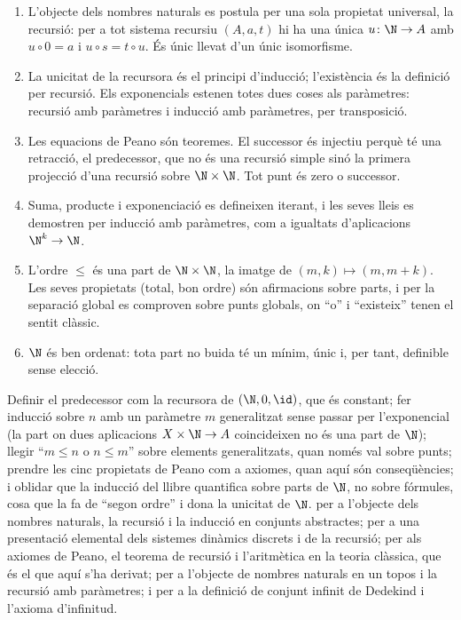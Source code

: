 \begin{resumcap}
\begin{enumerate}
  \item L'objecte dels nombres naturals es postula per una sola propietat universal, la recursió: per a tot sistema recursiu \((A,a,t)\) hi ha una única \(u\colon\N\to A\) amb \(u\circ0=a\) i \(u\circ s=t\circ u\). És únic llevat d'un únic isomorfisme.
  \item La unicitat de la recursora és el principi d'inducció; l'existència és la definició per recursió. Els exponencials estenen totes dues coses als paràmetres: recursió amb paràmetres i inducció amb paràmetres, per transposició.
  \item Les equacions de Peano són teoremes. El successor és injectiu perquè té una retracció, el predecessor, que no és una recursió simple sinó la primera projecció d'una recursió sobre \(\N\times\N\). Tot punt és zero o successor.
  \item Suma, producte i exponenciació es defineixen iterant, i les seves lleis es demostren per inducció amb paràmetres, com a igualtats d'aplicacions \(\N^k\to\N\).
  \item L'ordre \(\le\) és una part de \(\N\times\N\), la imatge de \((m,k)\mapsto(m,m+k)\). Les seves propietats (total, bon ordre) són afirmacions sobre parts, i per la separació global es comproven sobre punts globals, on \enquote{o} i \enquote{existeix} tenen el sentit clàssic.
  \item \(\N\) és ben ordenat: tota part no buida té un mínim, únic i, per tant, definible sense elecció.
\end{enumerate}
 Definir el predecessor com la recursora de \((\N,0,\id)\), que és constant; fer inducció sobre \(n\) amb un paràmetre \(m\) generalitzat sense passar per l'exponencial (la part on dues aplicacions \(X\times\N\to A\) coincideixen no és una part de \(\N\)); llegir \enquote{\(m\le n\) o \(n\le m\)} sobre elements generalitzats, quan només val sobre punts; prendre les cinc propietats de Peano com a axiomes, quan aquí són conseqüències; i oblidar que la inducció del llibre quantifica sobre parts de \(\N\), no sobre fórmules, cosa que la fa de \enquote{segon ordre} i dona la unicitat de \(\N\).
 \cite[§§7.3--7.5]{lawvere-rosebrugh} per a l'objecte dels nombres naturals, la recursió i la inducció en conjunts abstractes; \cite[sessió~26 i article~V]{lawvere-schanuel} per a una presentació elemental dels sistemes dinàmics discrets i de la recursió; \cite[§§11--13]{halmos} per als axiomes de Peano, el teorema de recursió i l'aritmètica en la teoria clàssica, que és el que aquí s'ha derivat; \cite[§4.7]{maclane-moerdijk} per a l'objecte de nombres naturals en un topos i la recursió amb paràmetres; i \cite[pàg.~12]{bell2006} per a la definició de conjunt infinit de Dedekind i l'axioma d'infinitud.
\end{resumcap}
